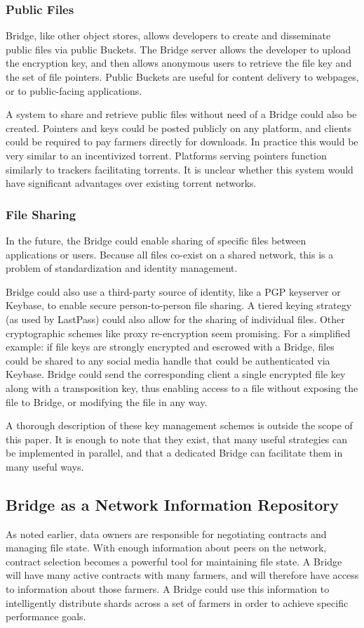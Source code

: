 \documentclass[a4paper,10pt]{article}
\begin{document}
\subsubsection{Public Files}
Bridge, like other object stores, allows developers to create and disseminate
public files via public Buckets. The Bridge server allows the developer to
upload the encryption key, and then allows anonymous users to retrieve the file
key and the set of file pointers. Public Buckets are useful for content delivery
to webpages, or to public-facing applications.

A system to share and retrieve public files without need of a Bridge could also
be created. Pointers and keys could be posted publicly on any platform, and
clients could be required to pay farmers directly for downloads. In practice
this would be very similar to an incentivized torrent. Platforms serving
pointers function similarly to trackers facilitating torrents. It is unclear
whether this system would have significant advantages over existing torrent
networks.

\subsubsection{File Sharing}
In the future, the Bridge could enable sharing of specific files between
applications or users. Because all files co-exist on a shared network, this is a
problem of standardization and identity management.

Bridge could also use a third-party source of identity, like a PGP keyserver or
Keybase\cite{29}, to enable secure person-to-person file sharing. A tiered
keying strategy (as used by LastPass\cite{28}) could also allow for the sharing
of individual files. Other cryptographic schemes like proxy re-encryption seem
promising. For a simplified example: if file keys are strongly encrypted and
escrowed with a Bridge, files could be shared to any social media handle that
could be authenticated via Keybase. Bridge could send the corresponding client a
single encrypted file key along with a transposition key, thus enabling access
to a file without exposing the file to Bridge, or modifying the file in any way.

A thorough description of these key management schemes is outside the scope of
this paper. It is enough to note that they exist, that many useful strategies
can be implemented in parallel, and that a dedicated Bridge can facilitate them
in many useful ways.

\subsection{Bridge as a Network Information Repository}
As noted earlier, data owners are responsible for negotiating contracts and
managing file state. With enough information about peers on the network,
contract selection becomes a powerful tool for maintaining file state. A Bridge
will have many active contracts with many farmers, and will therefore have
access to information about those farmers. A Bridge could use this information
to intelligently distribute shards across a set of farmers in order to achieve
specific performance goals.
\end{document}
